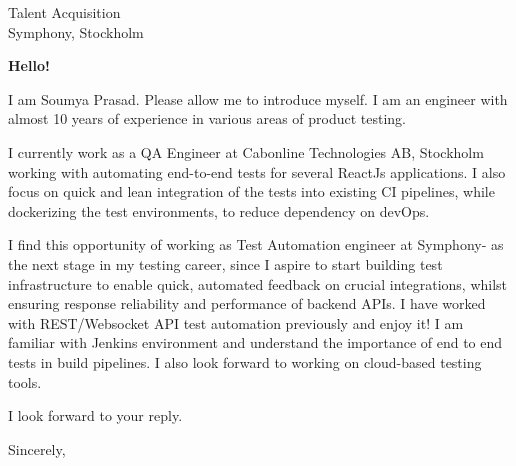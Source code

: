 \documentclass[10pt]{letter} %
\begin{document}

\begin{letter}{Talent Acquisition \\ Symphony, Stockholm} %


\opening{\textbf{Hello!}}
I am Soumya Prasad. Please allow me to introduce myself.
I am an engineer with almost 10 years of experience in various
areas of product testing.

\hfill \break
I currently work as a QA Engineer at Cabonline Technologies AB, Stockholm
working with automating end-to-end tests for several ReactJs applications.
I also focus on quick and lean integration of the tests into existing
CI pipelines, while dockerizing the test environments, to reduce dependency on devOps.

\hfill \break
I find this opportunity of working as Test Automation engineer at Symphony- as the next stage
in my testing career, since I aspire to start building test infrastructure to enable quick, automated
feedback on crucial integrations, whilst ensuring response reliability and performance of backend APIs.
I have worked with REST/Websocket API test automation previously and enjoy it!
I am familiar with Jenkins environment and understand the importance of end to end tests in build pipelines.
I also look forward to working on cloud-based testing tools.

I look forward to your reply.

\vspace{2\parskip} %
\closing{Sincerely,}
\vspace{2\parskip} %




\end{letter}
\end{document}
